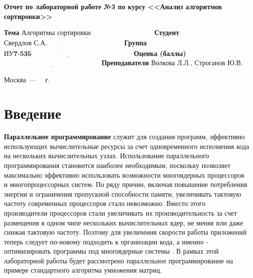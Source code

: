\documentclass[12pt]{report}
\begin{document}
\begin{titlepage}
	
	\begin{center}
		\Large\textbf{Отчет по лабораторной работе №3 по курсу <<Анализ алгоритмов сортировки>>}
	\end{center}
	
	\noindent\textbf{Тема} $\underline{\textbf{Алгоритмы сортировки~~~~~~~~~~~~~~~~~~~~~~~~~~~}}$\newline\newline\newline
	\noindent\textbf{Студент} $\underline{\textbf{Свердлов С.А.~~~~~~~~~~~~~~~~~~~~~~~~~~~~~~~~~}}$\newline\newline
	\noindent\textbf{Группа} $\underline{\textbf{ИУ7-53Б~~~~~~~~~~~~~~~~~~~~~~~~~~~~~~~~~~~~~~~~~~~~}}$\newline\newline
	\noindent\textbf{Оценка (баллы)} $\underline{\textbf{~~~~~~~~~~~~~~~~~~~~~~~~~~~~~~~~~~~~~~~~~~}}$\newline\newline
	\noindent\textbf{Преподаватели} $\underline{\textbf{Волкова Л.Л., Строганов Ю.В.}}$\newline
	
	\begin{center}
		\vfill
		Москва~---~\the\year
		~г.
	\end{center}
 \restoregeometry
\end{titlepage}

\setcounter{page}{2}

\tableofcontents

\newpage
\chapter*{Введение}

	\textbf{Параллельное программирование} служит для создания программ, эффективно использующих вычислительные ресурсы за счет одновременного исполнения кода на нескольких вычислительных узлах. Использование параллельного программирования становится наиболее необходимым, поскольку позволяет максимально эффективно использовать возможности многоядерных процессоров и многопроцессорных систем. По ряду причин, включая повышение потребления энергии и ограничения пропускной способности памяти, увеличивать тактовую частоту современных процессоров стало невозможно. Вместо этого производители процессоров стали увеличивать их производительность за счет размещения в одном чипе нескольких вычислительных ядер, не меняя или даже снижая тактовую частоту. Поэтому для увеличения скорости работы приложений теперь следует по-новому подходить к организации кода, а именно - оптимизировать программы под многоядерные системы \cite{MicrosoftPar}.
 В рамках этой лабораторной работы будет рассмотрено параллельное программирование на примере стандартного алгоритма умножения матриц.
\end{document}
